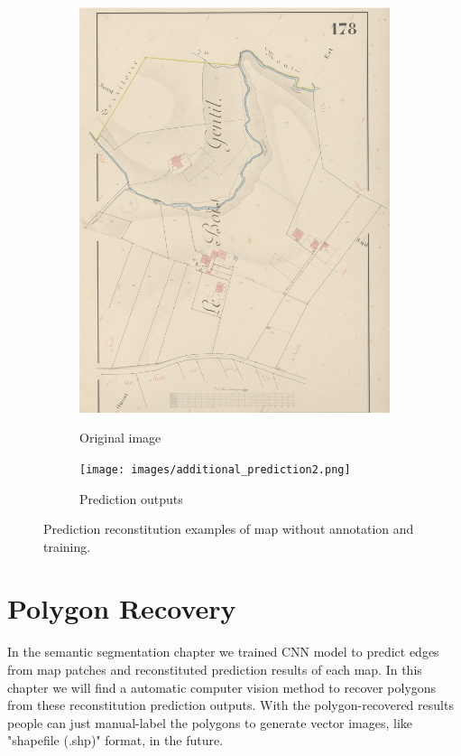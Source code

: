 \documentclass[12pt]{article}
\begin{document}
\begin{figure}[H]
	\begin{subfigure}[b]{.4\textwidth}
		\centering
		\includegraphics[width=1\linewidth]{images/additional_image2.png}  
		\label{fig:original-img}
		\caption{Original image}
	\end{subfigure}
	\begin{subfigure}[b]{.4\textwidth}
		\centering
		\texttt{[image: images/additional\_prediction2.png]}  
		\label{fig:original-pre}
		\caption{Prediction outputs}
	\end{subfigure}
	
	
	\caption{Prediction reconstitution examples of map without annotation and training.}
	\label{fig:additional-reconstitution}
\end{figure}


\section{Polygon Recovery}
In the semantic segmentation chapter we trained CNN model to predict edges from map patches and reconstituted prediction results of each map. In this chapter we will find a automatic computer vision method to recover polygons from these reconstitution prediction outputs. With the polygon-recovered results people can just manual-label the polygons to generate vector images, like "shapefile (.shp)" format, in the future.
\end{document}
